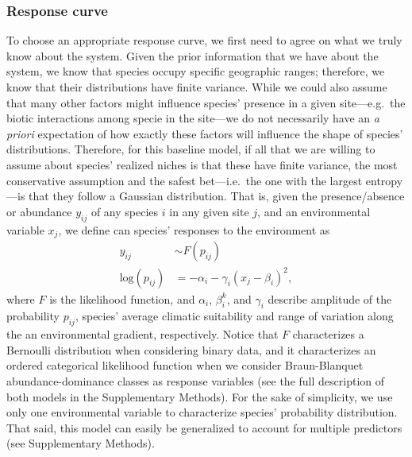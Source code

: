 \documentclass[11pt, a4paper]{article}
\begin{document}
\subsubsection*{Response curve}
To choose an appropriate response curve, we first need to agree on what we truly know about the system. Given the prior information that we have about the system, we know that species occupy specific geographic ranges; therefore, we know that their distributions have finite variance. While we could also assume that many other factors might influence species' presence in a given site---e.g.~the biotic interactions among specie in the site---we do not necessarily have an \textit{a priori} expectation of how exactly these factors will influence the shape of species' distributions. Therefore, for this baseline model, if all that we are willing to assume about species' realized niches is that these have finite variance, the most conservative assumption and the safest bet---i.e.~the one with the largest entropy---is that they follow a Gaussian distribution. That is, given the presence/absence or abundance $y_{ij}$ of any species $i$ in any given site $j$, and an environmental variable $x_{j}$, we define can species' responses to the environment as
\begin{equation}
\begin{split}
y_{ij} & \sim F\left(p_{ij}\right) \\
\text{log}\left(p_{ij}\right) & = -\alpha_{i} - \gamma_{i} \left(x_{j}-\beta_{i}\right)^2 ,
\end{split}
\label{eq:baseline-response}
\end{equation}
where $F$ is the likelihood function, and $\alpha_i$, $\beta_i^k$, and $\gamma_i$ describe amplitude of the probability $p_{ij}$, species' average climatic suitability and range of variation along the an environmental gradient, respectively. Notice that $F$ characterizes a Bernoulli distribution when considering binary data, and it characterizes an ordered categorical likelihood function when we consider Braun-Blanquet abundance-dominance classes as response variables (see the full description of both models in the Supplementary Methods). For the sake of simplicity, we use only one environmental variable to characterize species' probability distribution. That said, this model can easily be generalized to account for multiple predictors (see Supplementary Methods).
\end{document}
